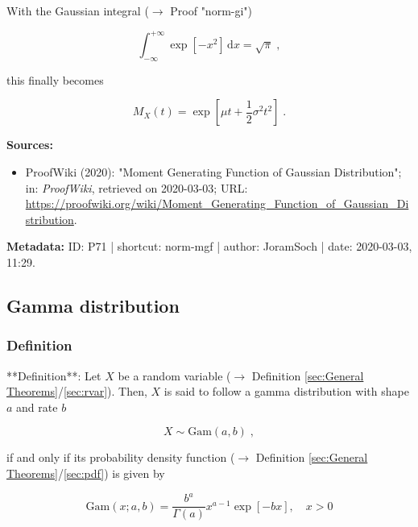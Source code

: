 \documentclass[a4paper,12pt,twoside]{book}
\begin{document}
With the Gaussian integral ($\rightarrow$ Proof "norm-gi")

\begin{equation} \label{eq:norm-mgf-gauss}
\int_{-\infty}^{+\infty} \exp\left[ -x^2 \right] \, \mathrm{d}x = \sqrt{\pi} \; ,
\end{equation}

this finally becomes

\begin{equation} \label{eq:norm-mgf-norm-mgf-qed}
M_X(t) = \exp\left[ \mu t + \frac{1}{2} \sigma^2 t^2 \right] \; .
\end{equation}


\vspace{1em}
\textbf{Sources:}
\begin{itemize}
\item ProofWiki (2020): "Moment Generating Function of Gaussian Distribution"; in: \textit{ProofWiki}, retrieved on 2020-03-03; URL: \url{https://proofwiki.org/wiki/Moment_Generating_Function_of_Gaussian_Distribution}.
\end{itemize}


\vspace{1em}
\textbf{Metadata:} ID: P71 | shortcut: norm-mgf | author: JoramSoch | date: 2020-03-03, 11:29.
\vspace{1em}



\subsection{Gamma distribution}

\subsubsection[\textit{Definition}]{Definition} \label{sec:gam}
\setcounter{equation}{0}

**Definition**: Let $X$ be a random variable ($\rightarrow$ Definition \ref{sec:General Theorems}/\ref{sec:rvar}). Then, $X$ is said to follow a gamma distribution with shape $a$ and rate $b$

\begin{equation} \label{eq:gam-gam}
X \sim \mathrm{Gam}(a, b) \; ,
\end{equation}

if and only if its probability density function ($\rightarrow$ Definition \ref{sec:General Theorems}/\ref{sec:pdf}) is given by

\begin{equation} \label{eq:gam-gam-pdf}
\mathrm{Gam}(x; a, b) = \frac{b^a}{\Gamma(a)} x^{a-1} \exp[-b x], \quad x > 0
\end{equation}
\end{document}
